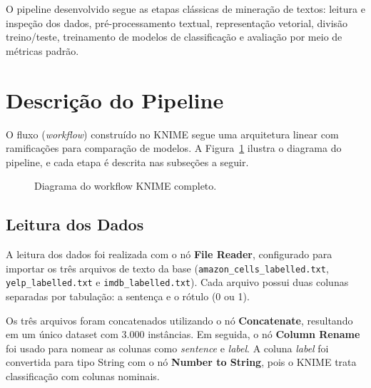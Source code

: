 \documentclass[12pt,a4paper]{article}
\begin{document}
O pipeline desenvolvido segue as etapas clássicas de mineração de textos: leitura e inspeção dos dados, pré-processamento textual, representação vetorial, divisão treino/teste, treinamento de modelos de classificação e avaliação por meio de métricas padrão.

\section{Descrição do Pipeline}

O fluxo (\textit{workflow}) construído no KNIME segue uma arquitetura linear com ramificações para comparação de modelos. A Figura~\ref{fig:workflow} ilustra o diagrama do pipeline, e cada etapa é descrita nas subseções a seguir.

\begin{figure}[H]
\centering
{}
\caption{Diagrama do workflow KNIME completo.}
\label{fig:workflow}
\end{figure}

\subsection{Leitura dos Dados}

A leitura dos dados foi realizada com o nó \textbf{File Reader}, configurado para importar os três arquivos de texto da base (\texttt{amazon\_cells\_labelled.txt}, \texttt{yelp\_labelled.txt} e \texttt{imdb\_labelled.txt}). Cada arquivo possui duas colunas separadas por tabulação: a sentença e o rótulo (0 ou 1).

Os três arquivos foram concatenados utilizando o nó \textbf{Concatenate}, resultando em um único dataset com 3.000 instâncias. Em seguida, o nó \textbf{Column Rename} foi usado para nomear as colunas como \textit{sentence} e \textit{label}. A coluna \textit{label} foi convertida para tipo String com o nó \textbf{Number to String}, pois o KNIME trata classificação com colunas nominais.
\end{document}
